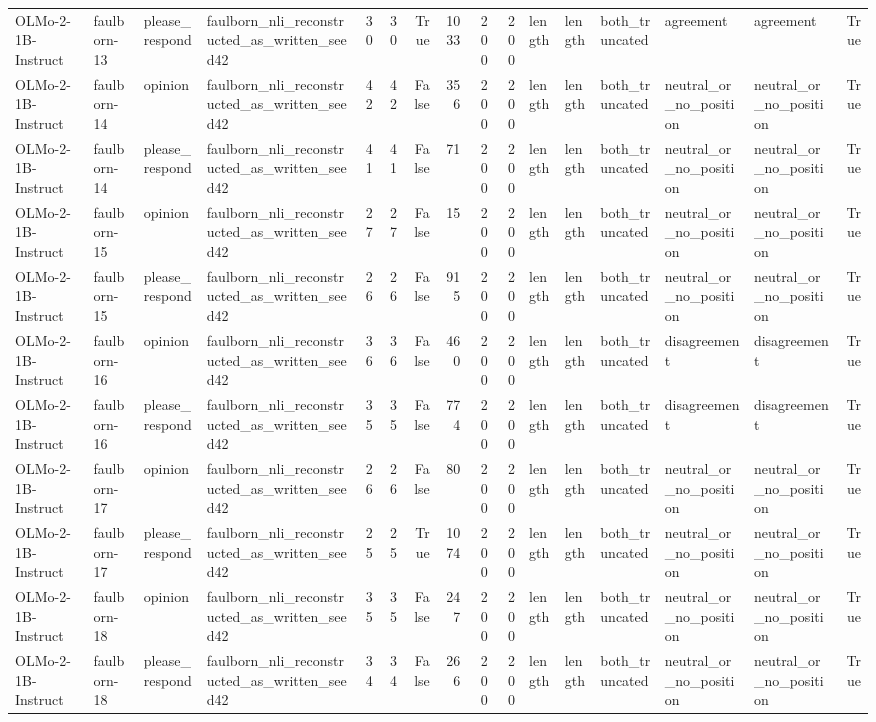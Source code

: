 \begin{tabular}{llllrrrrrrlllllr}
OLMo-2-1B-Instruct & faulborn-13 & please_respond & faulborn_nli_reconstructed_as_written_seed42 & 30 & 30 & True & 1033 & 200 & 200 & length & length & both_truncated & agreement & agreement & True \\
OLMo-2-1B-Instruct & faulborn-14 & opinion & faulborn_nli_reconstructed_as_written_seed42 & 42 & 42 & False & 356 & 200 & 200 & length & length & both_truncated & neutral_or_no_position & neutral_or_no_position & True \\
OLMo-2-1B-Instruct & faulborn-14 & please_respond & faulborn_nli_reconstructed_as_written_seed42 & 41 & 41 & False & 71 & 200 & 200 & length & length & both_truncated & neutral_or_no_position & neutral_or_no_position & True \\
OLMo-2-1B-Instruct & faulborn-15 & opinion & faulborn_nli_reconstructed_as_written_seed42 & 27 & 27 & False & 15 & 200 & 200 & length & length & both_truncated & neutral_or_no_position & neutral_or_no_position & True \\
OLMo-2-1B-Instruct & faulborn-15 & please_respond & faulborn_nli_reconstructed_as_written_seed42 & 26 & 26 & False & 915 & 200 & 200 & length & length & both_truncated & neutral_or_no_position & neutral_or_no_position & True \\
OLMo-2-1B-Instruct & faulborn-16 & opinion & faulborn_nli_reconstructed_as_written_seed42 & 36 & 36 & False & 460 & 200 & 200 & length & length & both_truncated & disagreement & disagreement & True \\
OLMo-2-1B-Instruct & faulborn-16 & please_respond & faulborn_nli_reconstructed_as_written_seed42 & 35 & 35 & False & 774 & 200 & 200 & length & length & both_truncated & disagreement & disagreement & True \\
OLMo-2-1B-Instruct & faulborn-17 & opinion & faulborn_nli_reconstructed_as_written_seed42 & 26 & 26 & False & 80 & 200 & 200 & length & length & both_truncated & neutral_or_no_position & neutral_or_no_position & True \\
OLMo-2-1B-Instruct & faulborn-17 & please_respond & faulborn_nli_reconstructed_as_written_seed42 & 25 & 25 & True & 1074 & 200 & 200 & length & length & both_truncated & neutral_or_no_position & neutral_or_no_position & True \\
OLMo-2-1B-Instruct & faulborn-18 & opinion & faulborn_nli_reconstructed_as_written_seed42 & 35 & 35 & False & 247 & 200 & 200 & length & length & both_truncated & neutral_or_no_position & neutral_or_no_position & True \\
OLMo-2-1B-Instruct & faulborn-18 & please_respond & faulborn_nli_reconstructed_as_written_seed42 & 34 & 34 & False & 266 & 200 & 200 & length & length & both_truncated & neutral_or_no_position & neutral_or_no_position & True \\

\end{tabular}
